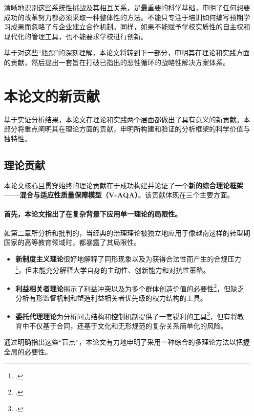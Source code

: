 清晰地识别这些系统性挑战及其相互关系，是最重要的科学基础，申明了任何想要成功的改革努力都必须采取一种整体性的方法。不能只专注于培训如何编写预期学习成果而忽略了与企业建立合作机制。同样，如果不能赋予学校实质性的自主权和现代化的管理工具，也不能要求学校进行创新。

基于对这些“瓶颈”的深刻理解，本论文将转到下一部分，申明其在理论和实践方面的贡献，然后提出一套旨在打破已指出的恶性循环的战略性解决方案体系。




\section{本论文的新贡献}
\label{sec:dong_gop_luan_an}

基于实证分析结果，本论文在理论和实践两个层面都做出了具有意义的新贡献。本部分将重点阐明其在理论方面的贡献，申明所构建和验证的分析框架的科学价值与独特性。

\subsection{理论贡献}
\label{subsec:dong_gop_ly_luan}

本论文核心且贯穿始终的理论贡献在于成功构建并论证了一个\textbf{新的综合理论框架——混合与适应性质量保障模型（V-AQA）}。该贡献体现在三个主要方面。

\paragraph{首先，本论文指出了在复杂背景下应用单一理论的局限性。}
如第二章所分析和批判的，当经典的治理理论被独立地应用于像越南这样的转型期国家的高等教育领域时，都暴露了其局限性。
\begin{itemize}
    \item \textbf{新制度主义理论}很好地解释了同形现象以及为获得合法性而产生的合规压力\footcite{MeyerPowell2020}，但未能充分解释大学自身的主动性、创新能力和对抗性策略。
    \item \textbf{利益相关者理论}揭示了利益冲突以及为多个群体创造价值的必要性\footcite{Freeman1984}，但缺乏分析有形监督机制和塑造利益相关者优先级的权力结构的工具。
    \item \textbf{委托代理理论}为分析问责结构和控制机制提供了一套锐利的工具\footcite{JensenMeckling1976}，但有将教育中不仅基于合同，还基于文化和无形规范的复杂关系简单化的风险。
\end{itemize}
通过明确指出这些“盲点”，本论文有力地申明了采用一种综合的多理论方法以把握全局的必要性。


